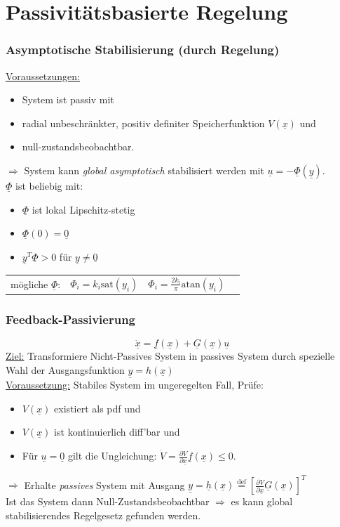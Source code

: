 \documentclass[german]{latex4ei/latex4ei_sheet}
\newcommand{\U}{\underline}
\begin{document}
\section{Passivitätsbasierte Regelung}
\begin{sectionbox}
\subsubsection{Asymptotische Stabilisierung (durch Regelung)}\label{AsymStabil}
\underline{Voraussetzungen:}
\begin{itemize}
	\item System ist passiv mit
	\item radial unbeschränkter, positiv definiter Speicherfunktion $V(\U{x})$ und
	\item null-zustandsbeobachtbar.
\end{itemize}
$\Rightarrow$ System kann \textit{global asymptotisch} stabilisiert werden mit $\U{u} = -\U{\Phi}(\U{y})$.\\
$\U{\Phi}$ ist beliebig mit:
\begin{itemize}
  \item $\U{\Phi}$ ist lokal Lipschitz-stetig
  \item $\U{\Phi}(0) = \U{0}$
  \item $\U{y}^T \U{\Phi} > 0$ für $\U{y} \neq \U{0}$
\end{itemize}

\begin{tabular}{cccc}
mögliche $\U{\Phi}$:  & $\Phi_i = k_i \text{sat}(y_i)$ & $\Phi_i = \frac{2 k_i}{\pi}\text{atan}(y_i)$ &
\end{tabular}

\subsubsection{Feedback-Passivierung}
$$ \dot{\U{x}} = \U{f}(\U{x}) + \U{G}(\U{x})\U{u} $$
\underline{Ziel:} Transformiere Nicht-Passives System in passives System durch spezielle Wahl der Ausgangsfunktion $\U{y}=h(\U{x})$ \\
\underline{Voraussetzung:} Stabiles System im ungeregelten Fall, Prüfe:
\begin{itemize}
	\item $V(\U{x})$ existiert als pdf und 
	\item $V(\U{x})$ ist kontinuierlich diff'bar und 
	\item Für $\U{u}=\U{0}$ gilt die Ungleichung: $\dot{V}=\frac{\partial V}{\partial \U{x}} \U{f}(\U{x}) \leq 0$.
\end{itemize}
$\Rightarrow$ Erhalte \textit{passives} System mit Ausgang $\U{y} = \U{h}(\U{x}) \overset{\text{def}}{=} \left[ \frac{\partial V}{\partial \U{x}} \U{G}(\U{x}) \right]^T$ \\
Ist das System dann Null-Zustandsbeobachtbar $\Rightarrow$ es kann global stabilisierendes Regelgesetz gefunden werden.\\


\end{sectionbox}
\end{document}
